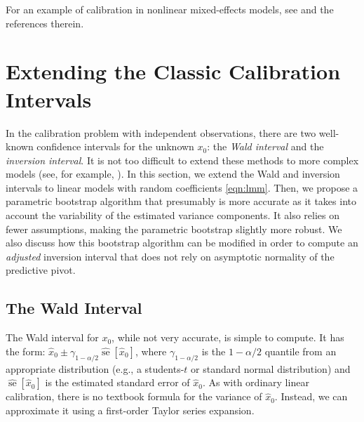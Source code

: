 \documentclass[useAMS,usenatbib,usegraphicx,referee]{biom}\usepackage[]{graphicx}\usepackage[]{color}
\newcommand{\se}{\operatorname{se}}
\begin{document}
For an example of calibration in nonlinear mixed-effects models, see \citet{concordet_calibration_2000} and the references therein.

\section{Extending the Classic Calibration Intervals}
\label{sec:extending}
In the calibration problem with independent observations, there are two well-known confidence intervals for the unknown $x_0$: the \textit{Wald interval} and the \textit{inversion interval}. It is not too difficult to extend these methods to more complex models (see, for example, \citet[chap. 10]{davidian_nonlinear_1995}). In this section, we extend the Wald and inversion intervals to linear models with random coefficients \eqref{eqn:lmm}. Then, we propose a parametric bootstrap algorithm that presumably is more accurate as it takes into account the variability of the estimated variance components. It also relies on fewer assumptions, making the parametric bootstrap slightly more robust. We also discuss how this bootstrap algorithm can be modified in order to compute an \textit{adjusted} inversion interval that does not rely on asymptotic normality of the predictive pivot.

\subsection{The Wald Interval}
\label{sec:wald}
The Wald interval for $x_0$, while not very accurate, is simple to compute. It has the form: $\widehat{x}_0 \pm \gamma_{1-\alpha/2} \widehat{\se}\left[\widehat{x}_0\right]$, where $\gamma_{1-\alpha/2}$ is the $1-\alpha/2$ quantile from an appropriate distribution (e.g., a students-$t$ or standard normal distribution) and $\widehat{\se}\left[\widehat{x}_0\right]$ is the estimated standard error of $\widehat{x}_0$. As with ordinary linear calibration, there is no textbook formula for the variance of $\widehat{x}_0$. Instead, we can approximate it using a first-order Taylor series expansion.
\end{document}
